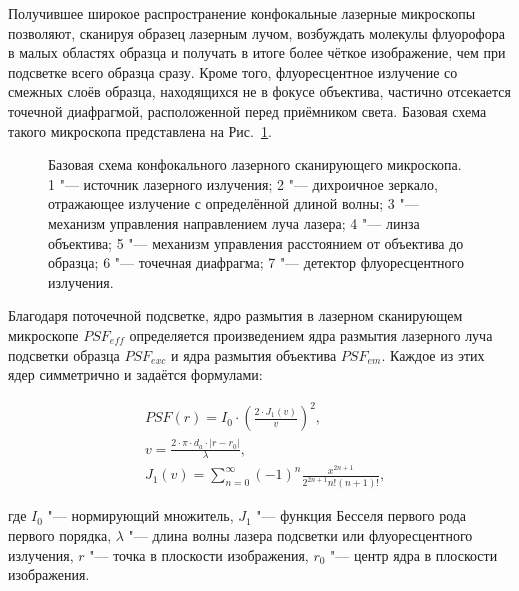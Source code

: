 
Получившее широкое распространение конфокальные лазерные микроскопы позволяют, сканируя образец лазерным лучом, возбуждать молекулы флуорофора в малых областях образца и получать в итоге более чёткое изображение, чем  при подсветке всего образца сразу. Кроме того, флуоресцентное излучение со смежных слоёв образца, находящихся не в фокусе объектива, частично отсекается точечной диафрагмой, расположенной перед приёмником света. Базовая схема такого микроскопа представлена на Рис.~\ref{fig:scanning-microscope-scheme}.

\begin{figure}[ht]
	\caption{Базовая схема конфокального лазерного сканирующего микроскопа. 1 "--- источник лазерного излучения; 2 "--- дихроичное зеркало, отражающее излучение с определённой длиной волны; 3 "--- механизм управления направлением луча лазера; 4 "--- линза объектива; 5 "--- механизм управления расстоянием от объектива до образца; 6 "--- точечная диафрагма; 7 "--- детектор флуоресцентного излучения.}
	\label{fig:scanning-microscope-scheme}
\end{figure}


Благодаря поточечной подсветке, ядро размытия в лазерном сканирующем микроскопе $PSF_{eff}$ определяется произведением ядра размытия лазерного луча подсветки образца $PSF_{exc}$ и ядра размытия объектива $PSF_{em}$. Каждое из этих ядер симметрично и задаётся формулами:

\begin{align*}
	&PSF\left(r\right) = I_0 \cdot \left(\frac{2\cdot J_1\left(v\right)}{v}\right)^2, \\
	&v=\frac{2\cdot\pi\cdot d_a\cdot\left|r-r_0\right|}{\lambda}, \\
	&J_1(v)=\sum_{n=0}^{\infty}{\left(-1\right)^n\frac{x^{2n+1}}{2^{2n+1}n!\left(n+1\right)!}},
\end{align*}

\noindent где $I_0$ "--- нормирующий множитель, $J_1$ "--- функция Бесселя первого рода первого порядка, $\lambda$ "--- длина волны лазера подсветки или флуоресцентного излучения, $r$ "--- точка в плоскости изображения, $r_0$ "--- центр ядра в плоскости изображения.

